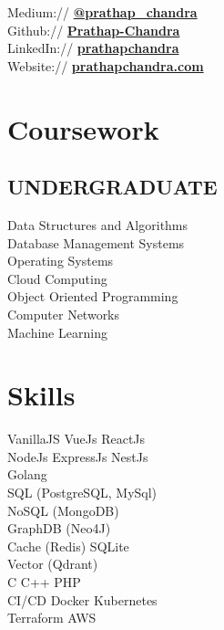 \documentclass{deedy-resume-openfont}
\begin{document}
\begin{minipage}[t]{0.33\textwidth}
Medium:// \href{https://medium.com/@prathap_chandra/}{\bf @prathap\_chandra} \\
Github:// \href{https://github.com/Prathap-Chandra}{\bf Prathap-Chandra} \\
LinkedIn://  \href{https://www.linkedin.com/in/prathapchandra}{\bf prathapchandra} \\
Website://  \href{https://www.prathapchandra.com/}{\bf prathapchandra.com} \\

\sectionsep
\section{Coursework}
\subsection{UNDERGRADUATE}
Data Structures and Algorithms\\
Database Management Systems\\
Operating Systems\\
Cloud Computing\\
Object Oriented Programming\\
Computer Networks\\
Machine Learning\\
\sectionsep


\section{Skills}
\textbullet{} VanillaJS \textbullet{} VueJs \textbullet{} ReactJs \\ \textbullet{} NodeJs  \textbullet{} ExpressJs \textbullet{} NestJs \\
\textbullet{} Golang \\
\textbullet{} SQL (PostgreSQL, MySql) \\ 
\textbullet{} NoSQL (MongoDB) \\ 
\textbullet{} GraphDB (Neo4J) \\ 
\textbullet{} Cache (Redis) \textbullet{} SQLite \\ 
\textbullet{} Vector (Qdrant) \\
\textbullet{} C \textbullet{} C++ \textbullet{} PHP\\
\textbullet{} CI/CD \textbullet{} Docker \textbullet{} Kubernetes \\
\textbullet{} Terraform \textbullet{} AWS \\
\sectionsep


\end{minipage} 
\end{document}
